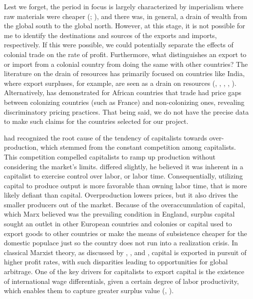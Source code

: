 \documentclass[10pt]{article}
\begin{document}
\par Lest we forget, the period in focus is largely characterized by imperialism where raw materials were cheaper (\citet{hobson1902scientific}; \citet{brewer2002marxist}), and there was, in general, a drain of wealth from the global south to the global north. However, at this stage, it is not possible for me to identify the destinations and sources of the exports and imports, respectively. If this were possible, we could potentially separate the effects of colonial trade on the rate of profit. Furthermore, what distinguishes an export to or import from a colonial country from doing the same with other countries? The literature on the drain of resources has primarily focused on countries like India, where export surpluses, for example, are seen as a drain on resources (\citet{naoroji1901poverty}, \citep{dutt1902economic}, \citet{patnaik2000new}, \citet{cuenca2007india}, \citet{nogues2021measuring}). Alternatively, \citet{Tadei2020} has demonstrated for African countries that trade had price gaps between colonizing countries (such as France) and non-colonizing ones, revealing discriminatory pricing practices. That being said, we do not have the precise data to make such claims for the countries selected for our project.
\par \citet{engels1844outlines} had recognized the root cause of the tendency of capitalists towards over-production, which stemmed from the constant competition among capitalists. This competition compelled capitalists to ramp up production without considering the market's limits. \citet{marx1996kapital} differed slightly, he believed it was inherent in a capitalist to exercise control over labor, or labor time. Consequentially, utilizing capital to produce output is more favorable than owning labor time, that is more likely defiant than capital. Overproduction lowers prices, but it also drives the smaller producers out of the market. Because of the overaccumulation of capital, which Marx believed was the prevailing condition in England, surplus capital sought an outlet in other European countries and colonies or capital used to export goods to other countries or make the means of subsistence cheaper for the domestic populace just so the country does not run into a realization crisis. In classical Marxist theory, as discussed by \citet{hilferding1981finance}, \citet{lenin1999imperialism}, and \citet{bukharin1929imperialism}, capital is exported in pursuit of higher profit rates, with such disparities leading to opportunities for global arbitrage. One of the key drivers for capitalists to export capital is the existence of international wage differentials, given a certain degree of labor productivity, which enables them to capture greater surplus value (\citet{smith2016imperialism}, \citet{suwandi2019value}).
\end{document}
